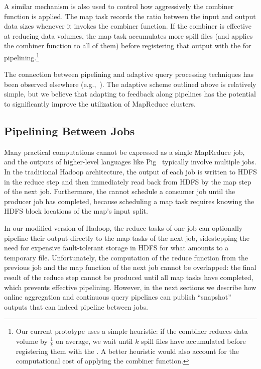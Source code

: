 A similar mechanism is also used to control how aggressively the combiner
function is applied.  The map task records the ratio between the input and
output data sizes whenever it invokes the combiner function.  If the combiner
is effective at reducing data volumes, the map task accumulates more spill
files (and applies the combiner function to all of them) before registering
that output with the {\TT} for pipelining.\footnote{Our current prototype uses
a simple heuristic: if the combiner reduces data volume by $\frac{1}{k}$ on
average, we wait until $k$ spill files have accumulated before registering them
with the {\TT}.  A better heuristic would also account for the computational
cost of applying the combiner function.}

The connection between pipelining and adaptive query processing techniques has
been observed elsewhere (e.g.,~\cite{eddies, bamboo}).  The adaptive scheme
outlined above is relatively simple, but we believe that adapting to feedback
along pipelines has the potential to significantly improve the utilization of
MapReduce clusters.

\subsection{Pipelining Between Jobs}
\label{ch:hop:sec:inter-pipe}

Many practical computations cannot be expressed as a single MapReduce job, and
the outputs of higher-level languages like Pig~\cite{pig-sigmod} typically involve
multiple jobs.  In the traditional Hadoop architecture, the output of each job
is written to HDFS in the reduce step and then immediately read back from HDFS
by the map step of the next job. Furthermore, the {\JT} cannot schedule a
consumer job until the producer job has completed, because scheduling a map task
requires knowing the HDFS block locations of the map's input split.

In our modified version of Hadoop, the reduce tasks of one job can optionally
pipeline their output directly to the map tasks of the next job, sidestepping
the need for expensive fault-tolerant storage in HDFS for what amounts to a
temporary file. Unfortunately, the computation of the reduce function from the
previous job and the map function of the next job cannot be overlapped: the
final result of the reduce step cannot be produced until all map tasks have
completed, which prevents effective pipelining. However, in the next sections we
describe how online aggregation and continuous query pipelines can publish
``snapshot'' outputs that can indeed pipeline between jobs.


